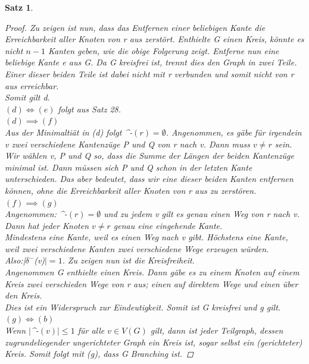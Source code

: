 \documentclass{article}
\newtheorem{satz}{Satz}
\begin{document}
\begin{satz}
\begin{proof}
      Zu zeigen ist nun, dass das Entfernen einer beliebigen Kante die Erreichbarkeit aller Knoten von r aus zerstört.
      Enthielte G einen Kreis, könnte es nicht $n-1$ Kanten geben, wie die obige Folgerung zeigt.
      Entferne nun eine beliebige Kante e aus G. Da G kreisfrei ist, trennt dies den Graph in zwei Teile.
      Einer dieser beiden Teile ist dabei nicht mit r verbunden und somit nicht von r aus erreichbar.\\
      Somit gilt d.\\
    $(d) \Leftrightarrow (e)$ folgt aus Satz 28.\\
    $(d)\implies (f)$\\ Aus der Minimaltiät in (d) folgt $ $\delta^-$ (r)= \emptyset $.
      Angenommen, es gäbe für irgendein v zwei verschiedene Kantenzüge P und Q von r nach v.
      Dann muss $v\neq r$ sein.
      Wir wählen v, P und Q so, dass die Summe der Längen der beiden Kantenzüge minimal ist.
      Dann müssen sich P und Q schon in der letzten Kante unterschieden.
      Das aber bedeutet, dass wir eine dieser beiden Kanten entfernen können, ohne die Erreichbarkeit aller Knoten von r aus zu zerstören.\\
    $(f) \implies (g)$\\
      Angenommen: $ $\delta^-$(r)=\emptyset$ und zu jedem v gilt es genau einen Weg von r nach v.\\
      Dann hat jeder Knoten $v\neq r$ genau eine eingehende Kante.\\
      Mindestens eine Kante, weil es einen Weg nach v gibt. Höchstens eine Kante, weil zwei verschiedene Kanten zwei verschiedene Wege erzeugen würden.\\
      Also:|$\delta^-$(v)$| =1$. 
      Zu zeigen nun ist die Kreisfreiheit.\\
      Angenommen G enthielte einen Kreis.
      Dann gäbe es zu einem Knoten auf einem Kreis zwei verschieden Wege von r aus; einen auf direktem Wege und einen über den Kreis.\\
      Dies ist ein Widerspruch zur Eindeutigkeit. Somit ist G kreisfrei und g gilt.\\
    $(g)\Leftrightarrow (b)$\\
     Wenn $|$\delta^-$(v)|\leq 1$ für alle $v \in V(G)$ gilt, dann ist jeder Teilgraph, dessen zugrundeliegender ungerichteter Graph ein Kreis ist, sogar selbst ein (gerichteter) Kreis.
      Somit folgt mit (g), dass G Branching ist.        
    \end{proof}
  \end{satz}
  \vspace{\baselineskip}
\end{document}
